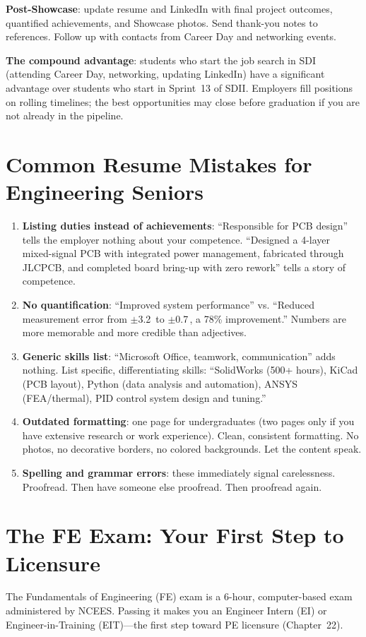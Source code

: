 \textbf{Post-Showcase}: update resume and LinkedIn with final project outcomes, quantified achievements, and Showcase photos. Send thank-you notes to references. Follow up with contacts from Career Day and networking events.

\textbf{The compound advantage}: students who start the job search in SDI (attending Career Day, networking, updating LinkedIn) have a significant advantage over students who start in Sprint~13 of SDII. Employers fill positions on rolling timelines; the best opportunities may close before graduation if you are not already in the pipeline.

\section{Common Resume Mistakes for Engineering Seniors}
\begin{enumerate}[nosep,leftmargin=1.5em]
\item \textbf{Listing duties instead of achievements}: ``Responsible for PCB design'' tells the employer nothing about your competence. ``Designed a 4-layer mixed-signal PCB with integrated power management, fabricated through JLCPCB, and completed board bring-up with zero rework'' tells a story of competence.
\item \textbf{No quantification}: ``Improved system performance'' vs. ``Reduced measurement error from $\pm$3.2\,\degC{} to $\pm$0.7\,\degC{}, a 78\% improvement.'' Numbers are more memorable and more credible than adjectives.
\item \textbf{Generic skills list}: ``Microsoft Office, teamwork, communication'' adds nothing. List specific, differentiating skills: ``SolidWorks (500+ hours), KiCad (PCB layout), Python (data analysis and automation), ANSYS (FEA/thermal), PID control system design and tuning.''
\item \textbf{Outdated formatting}: one page for undergraduates (two pages only if you have extensive research or work experience). Clean, consistent formatting. No photos, no decorative borders, no colored backgrounds. Let the content speak.
\item \textbf{Spelling and grammar errors}: these immediately signal carelessness. Proofread. Then have someone else proofread. Then proofread again.
\end{enumerate}



\section{The FE Exam: Your First Step to Licensure}
The Fundamentals of Engineering (FE) exam is a 6-hour, computer-based exam administered by NCEES. Passing it makes you an Engineer Intern (EI) or Engineer-in-Training (EIT)---the first step toward PE licensure (Chapter~22).

